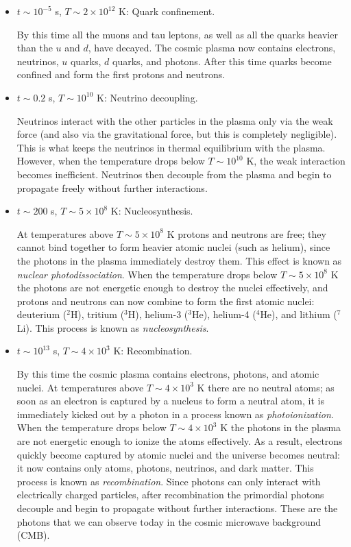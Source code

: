 \documentclass[11pt, a4paper,oneside,openright]{book}
\numberwithin{equation}{section}
\begin{document}
\begin{itemize}

\item $t\sim 10^{-5}$ s, $T\sim 2\times10^{12}$ K: Quark confinement.

By this time all the muons and tau leptons, as well as all the quarks heavier than the $u$ and $d$, have decayed. The cosmic plasma now contains electrons, neutrinos, $u$ quarks, $d$ quarks, and photons. After this time quarks become confined and form the first protons and neutrons.

\item $t\sim 0.2$ s, $T\sim 10^{10}$ K: Neutrino decoupling.

Neutrinos interact with the other particles in the plasma only via the weak force (and also via the gravitational force, but this is completely negligible). This is what keeps the neutrinos in thermal equilibrium with the plasma. However, when the temperature drops below $T\sim 10^{10}$ K, the weak interaction becomes inefficient. Neutrinos then decouple from the plasma and begin to propagate freely without further interactions.

\item $t\sim 200$ s, $T\sim 5\times10^8$ K: Nucleosynthesis.

At temperatures above $T\sim 5\times10^8$ K protons and neutrons are free; they cannot bind together to form heavier atomic nuclei (such as helium), since the photons in the plasma immediately destroy them. This effect is known as {\it nuclear photodissociation}. When the temperature drops below $T\sim 5\times10^8$ K the photons are not energetic enough to destroy the nuclei effectively, and protons and neutrons can now combine to form the first atomic nuclei: deuterium ($^2$H), tritium ($^3$H), helium-3 ($^3$He), helium-4 ($^4$He), and lithium ($^7$Li). This process is known as {\it nucleosynthesis}.

\item $t\sim 10^{13}$ s, $T\sim 4\times10^3$ K: Recombination.

By this time the cosmic plasma contains electrons, photons, and atomic nuclei. At temperatures above $T\sim 4\times10^3$ K there are no neutral atoms; as soon as an electron is captured by a nucleus to form a neutral atom, it is immediately kicked out by a photon in a process known as {\it photoionization}. When the temperature drops below $T\sim 4\times10^3$ K the photons in the plasma are not energetic enough to ionize the atoms effectively. As a result, electrons quickly become captured by atomic nuclei and the universe becomes neutral: it now contains only atoms, photons, neutrinos, and dark matter. This process is known as {\it recombination}. Since photons can only interact with electrically charged particles, after recombination the primordial photons decouple and begin to propagate without further interactions. These are the photons that we can observe today in the cosmic microwave background (CMB).


\end{itemize}
\end{document}
